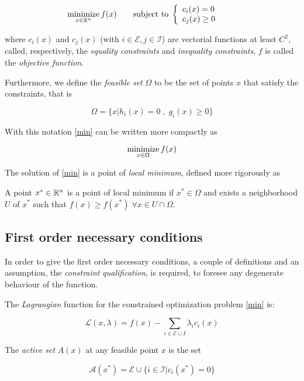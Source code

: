 \begin{align}
\label{min}
\mathop{\mathrm{minimize}}\limits_{x \in \mathbb{R}^n} f(x) \qquad \mbox{subject to} \; \left\{ \begin{array}{l}
c_i(x) = 0 \\
c_j(x) \geq 0 \\
\end{array} \right. \qquad
\end{align}

where $c_i(x)$ and $c_j(x)$ (with $i \in \mathcal{E}, j \in \mathcal{I}$) are vectorial functions at least $C^2$, called, respectively, the \emph{equality constraints} and \emph{inequality constraints}. $f$ is called the \emph{objective function}.

Furthermore, we define the \emph{feasible set} $\Omega$ to be the set of points $x$ that satisfy the constraints, that is

$$\Omega = \{ x | h_i (x) = 0 \;,\; g_i(x) \geq 0\}$$

With this notation \eqref{min} can be written more compactly as

$$\mathop{\mathrm{minimize}}\limits_{x \in \Omega} f(x) $$

The solution of \eqref{min} is a point of \emph{local minimum}, defined more rigorously as

\begin{defi}
A point $x^* \in \mathbb{R}^n$  is a point of local minimum if $x^* \in \Omega$ and exists a neighborhood $U$ of $x^*$ such that $f(x) \geq f(x^*) \; \forall x \in U \cap \Omega$.
\end{defi}

\subsection{First order necessary conditions}

In order to give the first order necessary conditions, a couple of definitions and an assumption, the \emph{constraint qualification}, is required, to foresee any degenerate behaviour of the function.

\begin{defi}
The \emph{Lagrangian} function for the constrained optimization problem \eqref{min} is:

$$\mathcal{L}(x,\lambda) = f(x) - \sum_{i \in \mathcal{E} \cup I} \lambda_i c_i (x)$$
\end{defi}

\begin{defi}
The \emph{active set} $A(x)$ at any feasible point $x$ is the set

$$\mathcal{A}(x^*) = \mathcal{E} \cup \{ i \in \mathcal{I} | c_i(x^*) = 0\}$$
\end{defi}


